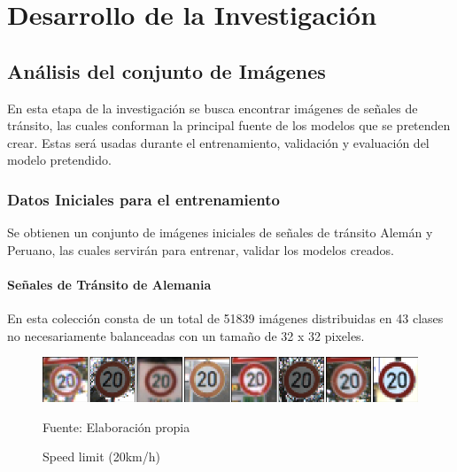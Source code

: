 \chapter{Desarrollo de la Investigación}
\setcounter{page}{82}
\renewcommand{\baselinestretch}{1.2} %

\section{Análisis del conjunto de Imágenes}
	
	En esta etapa de la investigación se busca encontrar imágenes de señales de tránsito, las cuales conforman la principal fuente de los modelos que se pretenden crear. Estas será usadas durante el entrenamiento, validación y evaluación del modelo pretendido.
	
	\subsection{Datos Iniciales para el entrenamiento}
		Se obtienen un conjunto de imágenes iniciales de señales de tránsito Alemán y Peruano, las cuales servirán para entrenar, validar los modelos creados.
		\subsubsection{Señales de Tránsito de Alemania}

			En esta colección consta de un total de 51839 imágenes distribuidas en 43 clases no necesariamente balanceadas con un tamaño de 32 x 32 pixeles.

			\begin{figure}[H]
				\begin{center}
				\includegraphics[width=1\textwidth]{images/desarrollo/imagenes/alemania/1__(1).png}
				\end{center}
				\begin{center}
				\caption{\small{Speed limit (20km/h)}}
				\vskip -0.25cm
				{\small{Fuente: Elaboración propia}}
				\end{center}
				\vspace{-1.5em}
			\end{figure}


